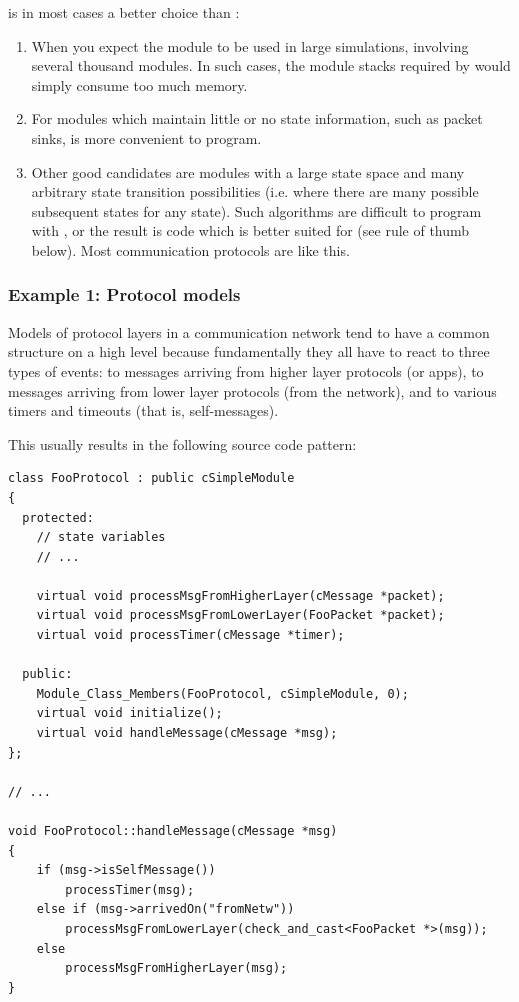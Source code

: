  is in most cases a better choice than :

\begin{enumerate}
  \item{When you expect the module to be used in large simulations,
      involving several thousand modules. In such cases, the module stacks
      required by  would simply consume too much memory.}
  \item{For modules which maintain little or no state information,
      such as packet sinks,  is more convenient to program.}
  \item{Other good candidates are modules with a large state space and
      many arbitrary state transition possibilities (i.e. where there
      are many possible subsequent states for any state). Such algorithms
      are difficult to program with , or the result is code
      which is better suited for  (see rule of thumb
      below). Most communication protocols are like this.}
\end{enumerate}


\subsubsection{Example 1: Protocol models}

Models of protocol layers in a communication network tend to have
a common structure on a high level because fundamentally they all have to react
to three types of events: to messages arriving from higher layer protocols
(or apps), to messages arriving from lower layer protocols (from the network),
and to various timers and timeouts (that is, self-messages).

This usually results in the following source code pattern:

\begin{verbatim}
class FooProtocol : public cSimpleModule
{
  protected:
    // state variables
    // ...

    virtual void processMsgFromHigherLayer(cMessage *packet);
    virtual void processMsgFromLowerLayer(FooPacket *packet);
    virtual void processTimer(cMessage *timer);

  public:
    Module_Class_Members(FooProtocol, cSimpleModule, 0);
    virtual void initialize();
    virtual void handleMessage(cMessage *msg);
};

// ...

void FooProtocol::handleMessage(cMessage *msg)
{
    if (msg->isSelfMessage())
        processTimer(msg);
    else if (msg->arrivedOn("fromNetw"))
        processMsgFromLowerLayer(check_and_cast<FooPacket *>(msg));
    else
        processMsgFromHigherLayer(msg);
}
\end{verbatim}

